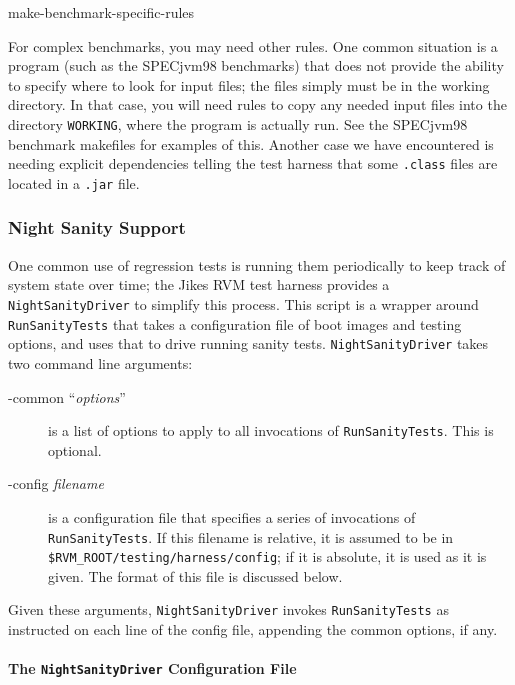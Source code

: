 \begin{description}
\begin{Label}{make-benchmark-specific-rules}
\begin{description}
\end{description}

For complex benchmarks, you may need other rules.  One common
situation is a program (such as the SPECjvm98 benchmarks)
that does not provide the ability to specify where to look for input
files; the files simply must be in the working directory.  In that
case, you will need rules to copy any needed input files into the
directory {\tt WORKING}, where the program is actually run.  See the SPECjvm98
benchmark makefiles for examples of this.  Another case we have
encountered is needing explicit dependencies telling the test harness
that some {\tt .class} files are located in a {\tt .jar} file.
\end{Label}

\end{description}

\subsubsection{Night Sanity Support}
 
One common use of regression tests is running them periodically to
keep track of system state over time; the Jikes RVM test harness
provides a {\tt{NightSanityDriver}} to simplify this process.  This
script is a wrapper around {\tt{RunSanityTests}} that takes a
configuration file of boot images and testing options, and uses that
to drive running sanity tests.  {\tt{NightSanityDriver}} takes two
command line arguments:
\begin{description}
\item[-common ``{\em{options}}''] is a list of options to apply to all
invocations of {\tt{RunSanityTests}}.  This is optional.
\item[-config {\em filename}] is a configuration file that specifies a
series of invocations of {\tt{RunSanityTests}}.  If this filename is
relative, it is assumed to be in {\tt \$RVM\_\-ROOT/testing/harness/config}; if
it is absolute, it is used as it is given.  The format of this file is
discussed below.
\end{description}

 Given these arguments, {\tt{NightSanityDriver}} invokes
{\tt{RunSanityTests}} as instructed on each line of the config file,
appending the common options, if any.

\paragraph{The \texttt{\textbf{NightSanityDriver}} Configuration File}

